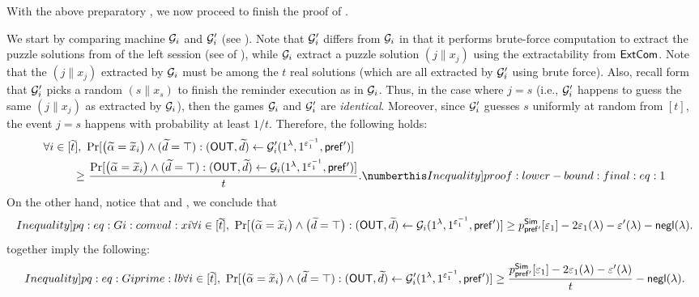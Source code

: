  With the above preparatory , we now proceed to finish the proof of .

 We start by comparing machine $\mathcal{G}_i$ and $\mathcal{G}'_i$ (see ). Note that $\mathcal{G}_i'$ differs from $\mathcal{G}_i$ in that it performs brute-force computation to extract the puzzle solutions from  of the left session (see  of ), while $\mathcal{G}_i$ extract a puzzle solution $(j\|x_j)$ using the extractability from $\mathsf{ExtCom}$. Note that the $(j\|x_j)$ extracted by $\mathcal{G}_i$ must be among the $t$ real solutions (which are all extracted by $\mathcal{G}'_i$ using brute force). Also, recall form  that $\mathcal{G}'_i$ picks a random $(s\|x_s)$ to finish the reminder execution as in $\mathcal{G}_i$. Thus, in the case where $j=s$ (i.e., $\mathcal{G}'_i$ happens to guess the same $(j\|x_j)$ as extracted by $\mathcal{G}_i$), then the games $\mathcal{G}_i$ and $\mathcal{G}_i'$ are {\em identical}. Moreover, since $\mathcal{G}'_i$ guesses $s$ uniformly at random from $[t]$, the event $j = s$ happens with probability at least $1/t$. Therefore, the following holds:
\begin{align*}
\forall i \in [\tilde{t}],~ & \Pr[\big(\tilde{\alpha} = \tilde{x}_i \big) \wedge (\tilde{d} = \top): (\OUT,\tilde{d}) \gets \mcal{G}'_i{(1^\secpar, 1^{\epsilon_1^{-1}}, \msf{pref'})}] \\ 
 \geq & ~
\frac{\Pr[\big( \tilde{\alpha} = \tilde{x}_i \big) \wedge (\tilde{d} = \top): (\OUT,\tilde{d}) \gets \mcal{G}_i{(1^\secpar, 1^{\epsilon_1^{-1}}, \msf{pref'})}]}{t}. \numberthis \label[Inequality]{proof:lower-bound:final:eq:1}
\end{align*}
On the other hand, notice that  and , we conclude that
\begin{equation}\label[Inequality]{pq:eq:Gi:comval:xi}
    \forall i \in [\tilde{t}],~\Pr[\big(\tilde{\alpha} = \tilde{x}_i\big) \wedge \big(\tilde{d} = \top\big): (\OUT,\tilde{d}) \gets \mcal{G}_i{(1^\secpar, 1^{\epsilon_1^{-1}}, \msf{pref'})}] \geq p^{\msf{Sim}}_{\msf{pref'}}[\epsilon_1] - 2\epsilon_1(\secpar) - \epsilon'(\secpar)- \negl(\secpar).
\end{equation}
 together imply the following: 
\begin{equation}\label[Inequality]{pq:eq:Giprime:lb}
\forall i \in [\tilde{t}],~\Pr[\big( \tilde{\alpha} = \tilde{x}_i \big)\wedge (\tilde{d} = \top): (\OUT,\tilde{d}) \gets \mcal{G}_i'(1^\secpar, 1^{\epsilon_1^{-1}}, \msf{pref'})] \geq  \frac{p^{\msf{Sim}}_{\msf{pref'}}[\epsilon_1] - 2\epsilon_1(\secpar) - \epsilon'(\secpar)}{t} -\negl(\secpar).
\end{equation}


